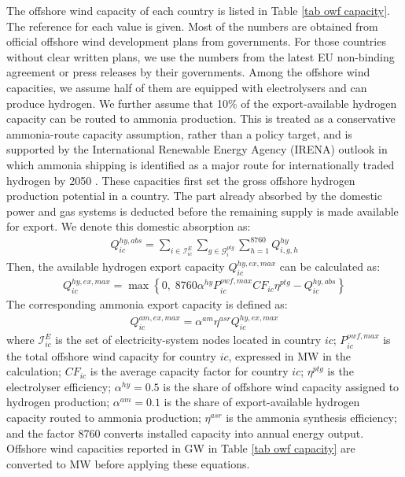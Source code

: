 \documentclass[sn-mathphys,Numbered]{sn-jnl}%
\theoremstyle{plain}%
\theoremstyle{definition}%
\theoremstyle{remark}%
\begin{document}
The offshore wind capacity of each country is listed in Table \ref{tab owf capacity}. The reference for each value is given. Most of the numbers are obtained from official offshore wind development plans from governments. For those countries without clear written plans, we use the numbers from the latest EU non-binding agreement or press releases by their governments. Among the offshore wind capacities, we assume half of them are equipped with electrolysers and can produce hydrogen. We further assume that 10\% of the export-available hydrogen capacity can be routed to ammonia production. This is treated as a conservative ammonia-route capacity assumption, rather than a policy target, and is supported by the International Renewable Energy Agency (IRENA) outlook in which ammonia shipping is identified as a major route for internationally traded hydrogen by 2050 \cite{IRENAGlobalHydrogenTradeOutlook2022}. These capacities first set the gross offshore hydrogen production potential in a country. The part already absorbed by the domestic power and gas systems is deducted before the remaining supply is made available for export. We denote this domestic absorption as:
\begin{align}
    Q_{ic}^{hy,abs} = \sum_{i \in \mathcal{I}_{ic}^E} \sum_{g \in \mathcal{G}_i^{ptg}} \sum_{h=1}^{8760} Q_{i,g,h}^{hy}
\end{align}
Then, the available hydrogen export capacity $Q_{ic}^{hy,ex,max}$ can be calculated as:
\begin{align}
    Q_{ic}^{hy,ex,max} = \max \left\{0,\; 8760 \alpha^{hy} P_{ic}^{owf,max} CF_{ic} \eta^{ptg} - Q_{ic}^{hy,abs} \right\}
\end{align}
The corresponding ammonia export capacity is defined as:
\begin{align}
    Q_{ic}^{am,ex,max} = \alpha^{am} \eta^{asr} Q_{ic}^{hy,ex,max}
\end{align}
where $\mathcal{I}_{ic}^E$ is the set of electricity-system nodes located in country $ic$; $P_{ic}^{owf,max}$ is the total offshore wind capacity for country $ic$, expressed in MW in the calculation; $CF_{ic}$ is the average capacity factor for country $ic$; $\eta^{ptg}$ is the electrolyser efficiency; $\alpha^{hy}=0.5$ is the share of offshore wind capacity assigned to hydrogen production; $\alpha^{am}=0.1$ is the share of export-available hydrogen capacity routed to ammonia production; $\eta^{asr}$ is the ammonia synthesis efficiency; and the factor 8760 converts installed capacity into annual energy output. Offshore wind capacities reported in GW in Table \ref{tab owf capacity} are converted to MW before applying these equations.
\end{document}
